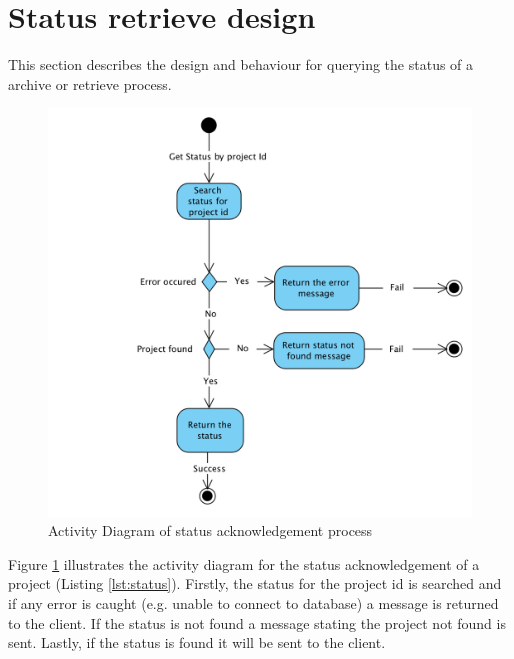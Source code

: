 \section{Status retrieve design}
This section describes the design and behaviour for querying the status of a archive or retrieve process.

\begin{figure}[H]
    \centering \includegraphics[scale=0.7]{grafiken/activityStatus.png}
    \caption{Activity Diagram of status acknowledgement process}
    \label{fig:activityStatus}
\end{figure}

Figure \ref{fig:activityStatus} illustrates the activity diagram for the status acknowledgement of a project (Listing \ref{lst:status}). Firstly,
the status for the project id is searched and if any error is caught (e.g. unable to connect to database) a message is returned to the client. If the 
status is not found a message stating the project not found is sent. Lastly, if the status is found it will be sent to the client.

